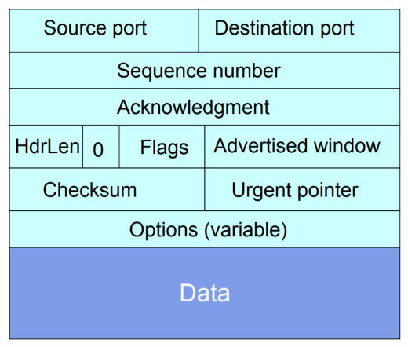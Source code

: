 \documentclass[a4paper, fontsize=8pt, landscape, DIV=1]{scrartcl}
\begin{document}
\begin{multicols*}{4}
		\includegraphics[width=\columnwidth]{images/Transport_Layer/TCP_header.png}
		

\end{multicols*}
\end{document}
